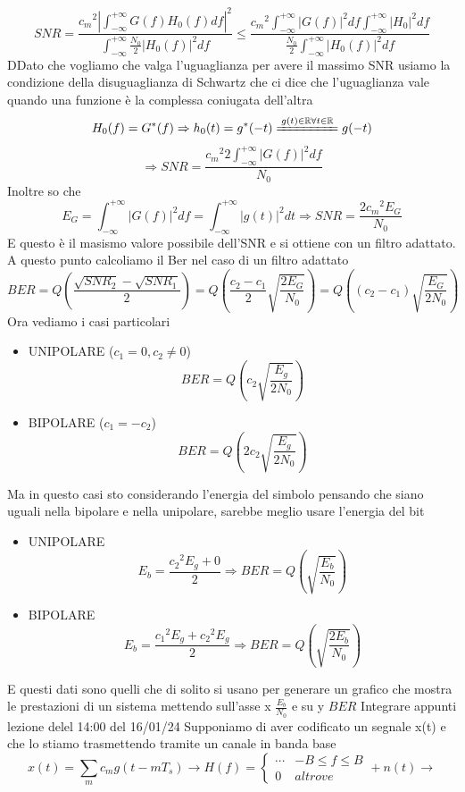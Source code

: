 \documentclass{article}
\newcommand{\intfity}{\int_{-\infty}^{+\infty}}
\begin{document}
\[SNR=\frac{{c_m}^2\left|\intfity G(f)H_0(f)df\right|^2}{\intfity\frac{N_0}{2}{|H_0(f)|}^2df}\leq\frac{{c_m}^2\intfity {|G(f)|}^2df\intfity{|H_0|}^2df}{\frac{N_0}{2}\intfity{|H_0(f)|}^2df}\]
DDato che vogliamo che valga l'uguaglianza per avere il massimo SNR usiamo la condizione della disuguaglianza di Schwartz che ci dice che l'uguaglianza vale quando una funzione è la complessa coniugata dell'altra
\[H_0(f)=G^* (f)\Rightarrow h_0(t)=g^*(-t)\xlongequal{g(t)\in\mathbb{R}\forall t\in\mathbb{R}}g(-t)\]
\[\Rightarrow SNR=\frac{{c_m}^2 2\intfity{|G(f)|^2}df}{N_0}\]
Inoltre so che
\[E_G=\intfity {|G(f)|}^2df=\intfity{|g(t)|}^2 dt\Rightarrow SNR=\frac{2{c_m}^2 E_G}{N_0}\]
E questo è il masismo valore possibile dell'SNR e si ottiene con un filtro adattato.\\
A questo punto calcoliamo il Ber nel caso di un filtro adattato
\[BER=Q\left(\frac{\sqrt{SNR_2}-\sqrt{SNR_1}}{2}\right)=Q\left(\frac{c_2-c_1}{2}\sqrt{\frac{2E_G}{N_0}}\right)=Q\left((c_2-c_1)\sqrt{\frac{E_G}{2N_0}}\right)\]
Ora vediamo i casi particolari
\begin{itemize}
    \item UNIPOLARE (\(c_1=0, c_2\neq0\))
        \[BER=Q\left(c_2\sqrt{\frac{E_g}{2N_0}}\right)\]
    \item BIPOLARE (\(c_1=-c_2\))
        \[BER=Q\left(2c_2\sqrt{\frac{E_g}{2N_0}}\right)\]
\end{itemize}
Ma in questo casi sto considerando l'energia del simbolo pensando che siano uguali nella bipolare e nella unipolare, sarebbe meglio usare l'energia del bit
\begin{itemize}
    \item UNIPOLARE
        \[E_b=\frac{{c_2}^2 E_g+0}{2}\Rightarrow BER=Q\left(\sqrt{\frac{E_b}{N_0}}\right)\]
    \item BIPOLARE
        \[E_b=\frac{{c_1}^2 E_g+{c_2}^2 E_g}{2}\Rightarrow BER=Q\left(\sqrt{\frac{2E_b}{N_0}}\right)\]
\end{itemize}
E questi dati sono quelli che di solito si usano per generare un grafico che mostra le prestazioni di un sistema mettendo sull'asse x \(\frac{E_b}{N_0}\) e su y \(BER\)
\newpage
\Huge Integrare appunti lezione delel 14:00 del 16/01/24\normalsize
\newpage
Supponiamo di aver codificato un segnale x(t) e che lo stiamo trasmettendo tramite un canale in banda base
\[x(t)=\sum_{m} c_m g(t-mT_s)\to\boxed{H(f)=\begin{cases}\cdots&-B\leq f\leq B\\0&altrove\end{cases}+n(t)}\to\]
\end{document}
